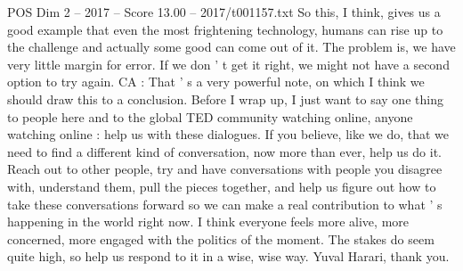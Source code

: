 \begin{textsample}{POS Dim 2 – 2017 – Score 13.00 – 2017/t001157.txt}
So this, I think, gives us a good example that even the most frightening technology, humans can rise up to the challenge and actually some good can come out of it.
The problem is, we have very little margin for error.
If we don ' t get it right, we might not have a second option to try again.
CA : That ' s a very powerful note, on which I think we should draw this to a conclusion.
Before I wrap up, I just want to say one thing to people here and to the global TED community watching online, anyone watching online : help us with these dialogues.
If you believe, like we do, that we need to find a different kind of conversation, now more than ever, help us do it.
Reach out to other people, try and have conversations with people you disagree with, understand them, pull the pieces together, and help us figure out how to take these conversations forward so we can make a real contribution to what ' s happening in the world right now.
I think everyone feels more alive, more concerned, more engaged with the politics of the moment.
The stakes do seem quite high, so help us respond to it in a wise, wise way.
Yuval Harari, thank you.

\end{textsample}
